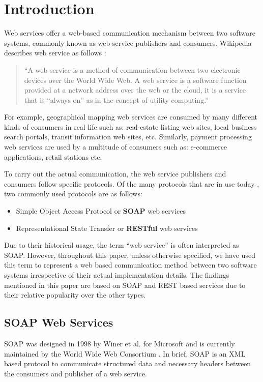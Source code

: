 \documentclass[runningheads,a4paper]{llncs}
\begin{document}
\section{Introduction}

Web services offer a web-based communication mechanism between two software systems, commonly known as web service publishers and consumers. Wikipedia describes web service as follows \cite{web_service_wiki}:

\begin{quote}
``A web service is a method of communication between two electronic devices over the World Wide Web. A web service is a software function provided at a network address over the web or the cloud, it is a service that is ``always on'' as in the concept of utility computing.''
\end{quote}

For example, geographical mapping web services are consumed by many different kinds of consumers in real life such as: real-estate listing web sites, local business search portals, transit information web sites, etc. Similarly, payment processing web services are used by a multitude of consumers such as: e-commerce applications, retail stations etc.

To carry out the actual communication, the web service publishers and consumers follow specific protocols. Of the many protocols that are in use today \cite{web_service_protocols_wiki}, two commonly used protocols are as follows:

\begin{itemize}
  \item Simple Object Access Protocol or \textbf{SOAP} web services
  \item Representational State Transfer or \textbf{RESTful} web services
\end{itemize}

Due to their historical usage, the term ``web service'' is often interpreted as SOAP. However, throughout this paper, unless otherwise specified, we have used this term to represent a web based communication method between two software systems irrespective of their actual implementation details. The findings mentioned in this paper are based on SOAP and REST based services due to their relative popularity over the other types.

\subsection{SOAP Web Services} %
\label{sub:soap_web_services}
SOAP was designed in 1998 by Winer et al. for Microsoft and is currently maintained by the World Wide Web Consortium \cite{soap_wiki}. In brief, SOAP is an XML based protocol to communicate structured data and necessary headers between the consumers and publisher of a web service.
\end{document}
